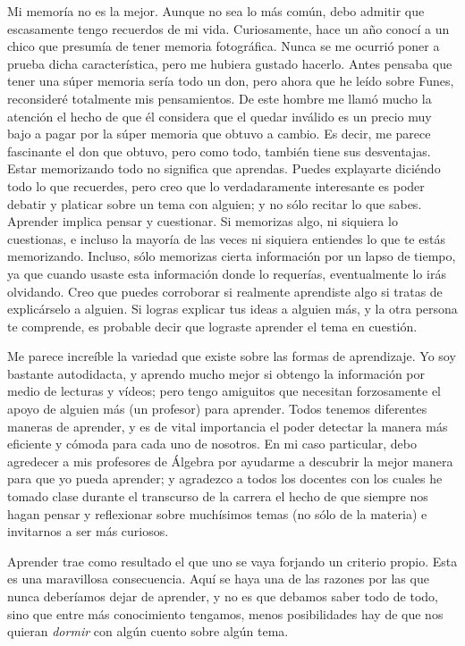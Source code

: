 \documentclass[letterpaper,11pt]{article}
\begin{document}
Mi memoría no es la mejor. Aunque no sea lo más común, debo admitir que 
escasamente tengo recuerdos de mi vida. Curiosamente, hace un año conocí a un 
chico que presumía de tener memoria fotográfica. Nunca se me ocurrió poner 
a prueba dicha característica, pero me hubiera gustado hacerlo. Antes pensaba
que tener una súper memoria sería todo un don, pero ahora que he leído sobre 
Funes, reconsideré totalmente mis pensamientos. De este hombre me llamó mucho 
la atención el hecho de que él considera que el quedar inválido es un precio 
muy bajo a pagar por la súper memoria que obtuvo a cambio. Es decir, me parece
fascinante el don que obtuvo, pero como todo, también tiene sus desventajas.
Estar memorizando todo no significa que aprendas. Puedes explayarte diciéndo 
todo lo que recuerdes, pero creo que lo verdadaramente interesante es poder 
debatir y platicar sobre un tema con alguien; y no sólo recitar lo que sabes.
Aprender implica pensar y cuestionar. Si memorizas algo, ni siquiera lo 
cuestionas, e incluso la mayoría de las veces ni siquiera entiendes lo que te 
estás memorizando. Incluso, sólo memorizas cierta información por un lapso de 
tiempo, ya que cuando usaste esta información donde lo requerías, eventualmente
lo irás olvidando. Creo que puedes corroborar si realmente aprendiste algo si 
tratas de explicárselo a alguien. Si logras explicar tus ideas a alguien más,
y la otra persona te comprende, es probable decir que lograste aprender el tema 
en cuestión. 

Me parece increíble la variedad que existe sobre las formas de aprendizaje. Yo 
soy bastante autodidacta, y aprendo mucho mejor si obtengo la información por 
medio de lecturas y vídeos; pero tengo amiguitos que necesitan forzosamente 
el apoyo de alguien más (un profesor) para aprender. Todos tenemos diferentes 
maneras de aprender, y es de vital importancia el poder detectar la manera más 
eficiente y cómoda para cada uno de nosotros. En mi caso particular, debo 
agredecer a mis profesores de Álgebra por ayudarme a descubrir la mejor manera 
para que yo pueda aprender; y agradezco a todos los docentes con los cuales 
he tomado clase durante el transcurso de la carrera el hecho de que siempre 
nos hagan pensar y reflexionar sobre muchísimos temas (no sólo de la materia)
e invitarnos a ser más curiosos. 

Aprender trae como resultado el que uno se vaya forjando un criterio propio. 
Esta es una maravillosa consecuencia. Aquí se haya una de las razones por las 
que nunca deberíamos dejar de aprender, y no es que debamos saber todo de todo, 
sino que entre más conocimiento tengamos, menos posibilidades hay de que nos 
quieran \textit{dormir} con algún cuento sobre algún tema. 
\end{document}
